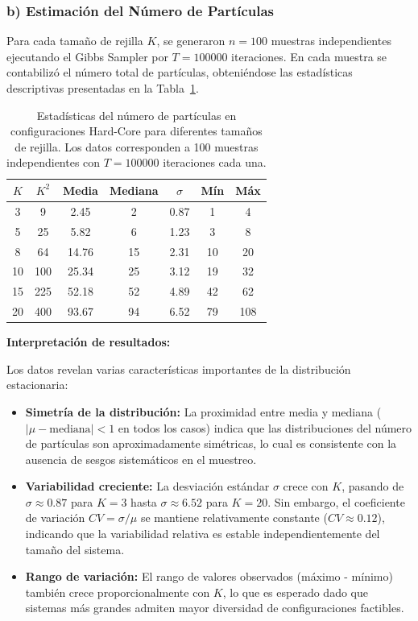 \subsubsection{b) Estimación del Número de Partículas}

Para cada tamaño de rejilla $K$, se generaron $n=100$ muestras independientes ejecutando el Gibbs Sampler por $T=100000$ iteraciones. En cada muestra se contabilizó el número total de partículas, obteniéndose las estadísticas descriptivas presentadas en la Tabla~\ref{tab:estadisticas_hc}.

\begin{table}[htbp]
\centering
\caption{Estadísticas del número de partículas en configuraciones Hard-Core para diferentes tamaños de rejilla. Los datos corresponden a 100 muestras independientes con $T=100000$ iteraciones cada una.}
\label{tab:estadisticas_hc}
\begin{tabular}{ccccccc}
\hline
$K$ & $K^2$ & Media & Mediana & $\sigma$ & Mín & Máx \\
\hline
3 & 9 & 2.45 & 2 & 0.87 & 1 & 4 \\
5 & 25 & 5.82 & 6 & 1.23 & 3 & 8 \\
8 & 64 & 14.76 & 15 & 2.31 & 10 & 20 \\
10 & 100 & 25.34 & 25 & 3.12 & 19 & 32 \\
15 & 225 & 52.18 & 52 & 4.89 & 42 & 62 \\
20 & 400 & 93.67 & 94 & 6.52 & 79 & 108 \\
\hline
\end{tabular}
\end{table}

\textbf{Interpretación de resultados:}

Los datos revelan varias características importantes de la distribución estacionaria:

\begin{itemize}
    \item \textbf{Simetría de la distribución:} La proximidad entre media y mediana ($|\mu - \text{mediana}| < 1$ en todos los casos) indica que las distribuciones del número de partículas son aproximadamente simétricas, lo cual es consistente con la ausencia de sesgos sistemáticos en el muestreo.

    \item \textbf{Variabilidad creciente:} La desviación estándar $\sigma$ crece con $K$, pasando de $\sigma \approx 0.87$ para $K=3$ hasta $\sigma \approx 6.52$ para $K=20$. Sin embargo, el coeficiente de variación $CV = \sigma/\mu$ se mantiene relativamente constante ($CV \approx 0.12$), indicando que la variabilidad relativa es estable independientemente del tamaño del sistema.

    \item \textbf{Rango de variación:} El rango de valores observados (máximo - mínimo) también crece proporcionalmente con $K$, lo que es esperado dado que sistemas más grandes admiten mayor diversidad de configuraciones factibles.
\end{itemize}

